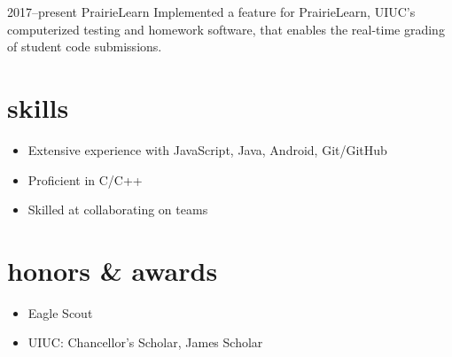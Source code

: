 \documentclass[nofooter]{resume}
\begin{document}
\begin{entrylist}

\entry
{2017--present}
{PrairieLearn}
{}
{Implemented a feature for PrairieLearn, UIUC's computerized testing and homework software, that enables the real-time grading of student code submissions.}

\end{entrylist}


\section{skills}

\noindent\begin{itemize}[leftmargin=0.45cm]
\setlength{\itemsep}{-5pt}
\item Extensive experience with JavaScript, Java, Android, Git/GitHub
\item Proficient in C/C++
\item Skilled at collaborating on teams
\end{itemize}\vspace{\parskip}


\section{honors \& awards}

\noindent\begin{itemize}[leftmargin=0.45cm]
\setlength{\itemsep}{-5pt}
\item Eagle Scout
\item UIUC: Chancellor's Scholar, James Scholar
\end{itemize}
\end{document}
